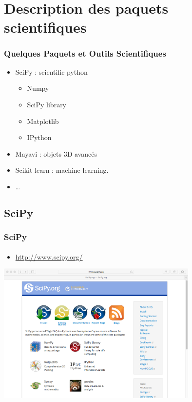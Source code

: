 \section{Description des paquets scientifiques}
\begin{frame}[fragile]
\frametitle{Quelques Paquets et Outils Scientifiques}
\begin{itemize}
 \item SciPy : scientific python 
 \begin{itemize}
  \item Numpy
  \item SciPy library
  \item Matplotlib
  \item IPython
 \end{itemize}
 \item Mayavi : objets 3D avancés
 \item Scikit-learn : machine learning.
 \item \dots
\end{itemize}
\end{frame}
\subsection{SciPy}
\begin{frame}[fragile]
\frametitle{SciPy}
\framesubtitle{}
\begin{itemize}
 \item \url{http://www.scipy.org/}
\end{itemize}
\begin{center}
\includegraphics[width=10cm]{./fig/scipy.png}
\end{center}
\end{frame}
